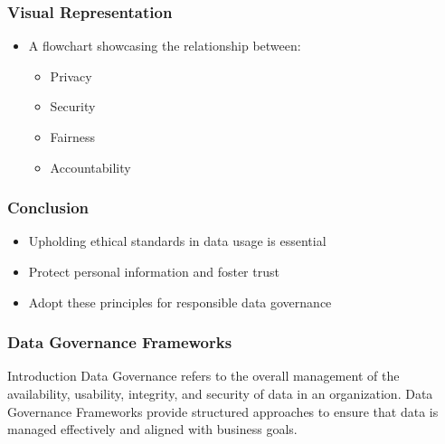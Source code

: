 \documentclass[aspectratio=169]{beamer}
\begin{document}
\begin{frame}[fragile]
    \frametitle{Visual Representation}
    \begin{itemize}
        \item A flowchart showcasing the relationship between:
        \begin{itemize}
            \item Privacy
            \item Security
            \item Fairness
            \item Accountability
        \end{itemize}
    \end{itemize}
    
    \begin{center}
    \end{center}
\end{frame}

\begin{frame}[fragile]
    \frametitle{Conclusion}
    \begin{itemize}
        \item Upholding ethical standards in data usage is essential
        \item Protect personal information and foster trust
        \item Adopt these principles for responsible data governance
    \end{itemize}
\end{frame}

\begin{frame}[fragile]
    \frametitle{Data Governance Frameworks}
    \begin{block}{Introduction}
        Data Governance refers to the overall management of the availability, usability, integrity, and security of data in an organization. 
        Data Governance Frameworks provide structured approaches to ensure that data is managed effectively and aligned with business goals.
    \end{block}
\end{frame}
\end{document}
